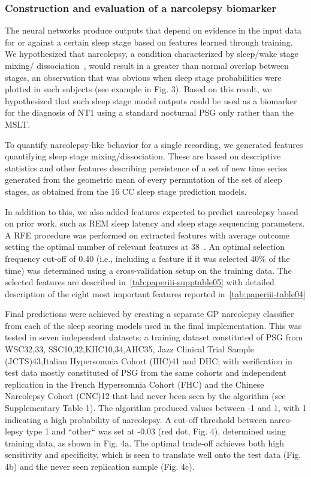 \subsubsection{Construction and evaluation of a narcolepsy biomarker}
The neural networks produce outputs that depend on evidence in the input data for or against a certain sleep stage based on features learned through training.
We hypothesized that narcolepsy, a condition characterized by sleep/wake stage mixing/ dissociation~\cite{Christensen2015a,Olsen2017,Jensen2014,Vassalli2013,Pizza2015}, would result in a greater than normal overlap between stages, an observation that was obvious when sleep stage probabilities were plotted in such subjects (see example in Fig. 3).
Based on this result, we hypothesized that such sleep stage model outputs could be used as a biomarker for the diagnosis of \ac{NT1} using a standard nocturnal \ac{PSG} only rather than the \ac{MSLT}.

To quantify narcolepsy-like behavior for a single recording, we generated features quantifying sleep stage mixing/dissociation. 
These are based on descriptive statistics and other features describing persistence of a set of new time series generated from the geometric mean of every permutation of the set of sleep stages, as obtained from the \num{16} CC sleep stage prediction models.

In addition to this, we also added features expected to predict narcolepsy based on prior work, such as \ac{REM} sleep latency and sleep stage sequencing parameters. 
A \ac{RFE} procedure was performed on extracted features with average outcome setting the optimal number of relevant features at \num{38}~\cite{Guyon2002}. 
An optimal selection frequency cut-off of \num{0.40} (i.e., including a feature if it was selected 40\% of the time) was determined using a cross-validation setup on the training data. 
The selected features are described in~\cref{tab:paperiii-supptable05} with detailed description of the eight most important features reported in~\cref{tab:paperiii-table04}

Final predictions were achieved by creating a separate \ac{GP} narcolepsy classifier from each of the sleep scoring models used in the final implementation. 
This was tested in seven independent datasets: a training dataset constituted of PSG from WSC32,33, SSC10,32,KHC10,34,AHC35, Jazz Clinical Trial Sample (JCTS)43,Italian Hypersomnia Cohort (IHC)41 and DHC; with verification in test data mostly constituted of PSG from the same cohorts and independent replication in the French Hypersomnia Cohort (FHC) and the Chinese Narcolepsy Cohort (CNC)12 that had never been seen by the algorithm (see Supplementary Table 1). 
The algorithm produced values between -1 and 1, with 1 indicating a high probability of narcolepsy. 
A cut-off threshold between narco- lepsy type 1 and “other“ was set at -0.03 (red dot, Fig. 4), determined using training data, as shown in Fig. 4a. 
The optimal trade-off achieves both high sensitivity and specificity, which is seen to translate well onto the test data (Fig. 4b) and the never seen replication sample (Fig. 4c).


